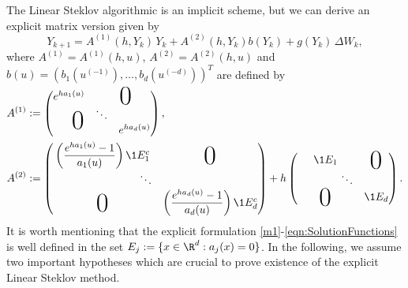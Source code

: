 The Linear Steklov algorithmic is an implicit scheme, but 
we can derive an explicit matrix version given by  
\begin{equation}\label{m1}
 Y_{k+1} = A^{(1)}(h,Y_k) \,Y_k + A^{(2)}(h,Y_k)b(Y_k)+ g(Y_k)\, \Delta W_k, 
\end{equation}
where  $A^{(1)}= A^{(1)}(h,u)$,  $A^{(2)}=A^{(2)}(h,u)$  and $b(u)=\left(
		b_1(u^{(-1)}), \dots , b_d(u^{(-d)})
	\right)^T$   are defined  by
\begin{align}\label{eqn:SolutionFunctions}	
	A^{(1)}&:=
		\begin{pmatrix}
			e^{ha_1(u)} & \multicolumn{2}{c}{\text{\kern0.5em\smash{\raisebox{-1ex}{\Huge 0}}}} \\
			&\ddots\\
			\multicolumn{2}{c}{\text{\kern-0.5em\smash{\raisebox{0.95ex}{\Huge 0}}}} 
			& e^{ha_d(u)}
		\end{pmatrix},
		\notag
		\\
	A^{(2)}&:=
	\begin{pmatrix}
		\left(
			\displaystyle
			\frac{e^{ha_1(u)} - 1}{a_1(u)}
		\right)\1{E_1^c}%
		&\BigZero\\
		\qquad \qquad \qquad \qquad\ddots&\\
		\BigZero&
		\left(
			\displaystyle
			\frac{e^{ha_d(u)} - 1}{a_d(u)}
		\right)\1{E_d^c}%
	\end{pmatrix}
	+h
	\begin{pmatrix}
		\1{E_1} & \BigZero\\
		\qquad \qquad \ddots\\
		\BigZero & 
		\1{E_d}
	\end{pmatrix}.	
\end{align}
It is worth mentioning that the explicit formulation \eqref{m1}-\eqref{eqn:SolutionFunctions} 
is well defined in the set $E_j:=\{x \in \R^d: a_j(x)=0\}$. In the following, we 
assume two important hypotheses which are crucial to prove existence 
of the explicit Linear Steklov method.

